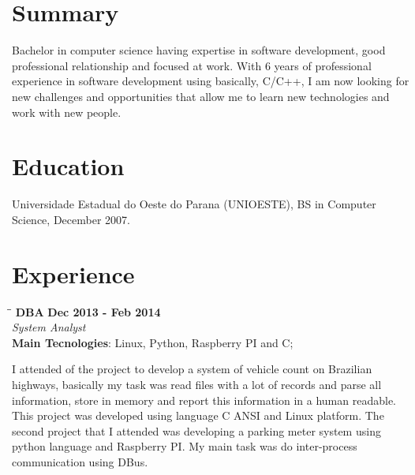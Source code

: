 \documentclass[margin]{res}
\begin{document}
  

\address{London, UK \\ benatto@gmail.com \\ Phone: 07405110040 \\ Post Code: SW16 2BU }
                           
                        
\begin{resume}                        
 
\section{Summary}       Bachelor in computer science having expertise in software development, good professional relationship and focused at work.
                        With 6 years of professional experience in software development using basically, C/C++, I am now looking for new challenges
                        and opportunities that allow me to learn new technologies and work with new people.
 
\section{Education}	Universidade Estadual do Oeste do Parana (UNIOESTE),  BS in Computer Science, December 2007.
  
\section{Experience}

\vspace{-0.1in}
   \begin{tabbing}
   \hspace{2.3in}\= \hspace{1.7in}\= \kill %
    \textbf{DBA}    \>\>\textbf{Dec 2013 - Feb 2014}\\
    \textit{System Analyst}\\        
    \textbf{Main Tecnologies}: Linux, Python, Raspberry PI and C;
   \end{tabbing}\vspace{-20pt}      %
    \vspace{2mm}
    I attended of the project to develop a system of vehicle count on Brazilian highways, basically my
    task was read files with a lot of records and parse all information, store in memory and report this
    information in a human readable. This project was developed using language C ANSI and Linux platform. 
    The second project that I attended was developing a parking meter system using python language and
    Raspberry PI. My main task was do inter-process communication using DBus.


\end{resume}
\end{document}
